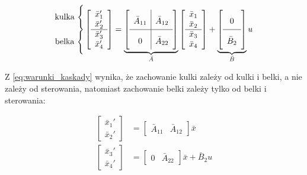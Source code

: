 \begin{equation}
    \renewcommand\arraystretch{2}
    \begin{matrix}
        \text{kulka}~\Bigg\{ \\
        \text{belka}~\Bigg\{ 
    \end{matrix}
    \renewcommand\arraystretch{1}
    \left[
    \begin{array}{c}
        \bar{x}_1' \\
        \bar{x}_2' \\
        \hline
        \bar{x}_3' \\
        \bar{x}_4'
    \end{array}
    \right]
    =
    \underbrace{
        \renewcommand\arraystretch{2}
        \left[
        \begin{array}{c|c}
           \bar{A}_{11} & \bar{A}_{12} \\
           \hline
           0 & \bar{A}_{22}
        \end{array}
        \right]
    }_{\bar{A}}
    \left[
    \begin{array}{c}
        \bar{x}_1 \\
        \bar{x}_2 \\
        \hline
        \bar{x}_3 \\
        \bar{x}_4 \\
    \end{array}
    \right]
    +
    \underbrace{
        \renewcommand\arraystretch{2}
        \left[
        \begin{array}{c}
        0 \\
        \hline
        \bar{B}_2
        \end{array}
        \right]
    }_{\bar{B}}
    u \label{eq:warunki_kaskady}
\end{equation}

Z \eqref{eq:warunki_kaskady} wynika, że zachowanie kulki zależy od kulki i belki, a nie zależy od sterowania, natomiast zachowanie belki zależy tylko od belki i sterowania:

\begin{align*}
    \begin{bmatrix}
        \bar{x}_1' \\ \bar{x}_2'
    \end{bmatrix}
    &= \begin{bmatrix}
    \bar{A}_{11} & \bar{A}_{12}
    \end{bmatrix} \bar{x} \\
    \begin{bmatrix}
    \bar{x}_3' \\ \bar{x}_4'
    \end{bmatrix}
    &= \begin{bmatrix}
    0 & \bar{A}_{22}
    \end{bmatrix} \bar{x}
    + \bar{B}_2 u
\end{align*}

